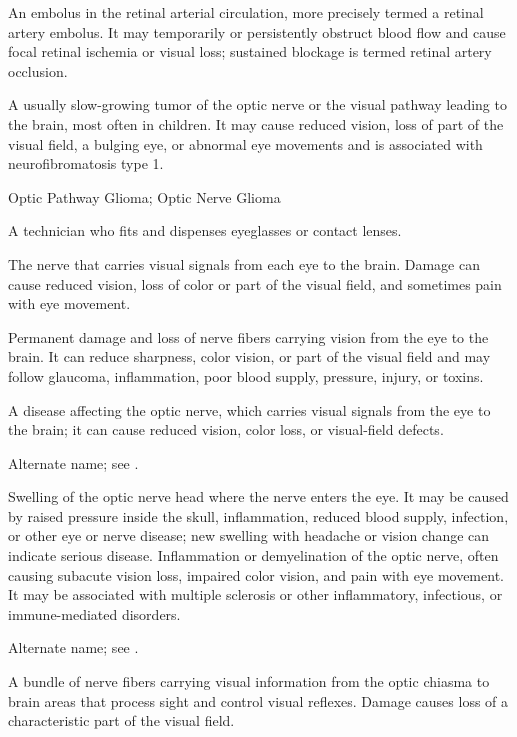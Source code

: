  An embolus in the retinal arterial circulation, more precisely termed a retinal artery embolus. It may temporarily or persistently obstruct blood flow and cause focal retinal ischemia or visual loss; sustained blockage is termed retinal artery occlusion.

 A usually slow-growing tumor of the optic nerve or the visual pathway leading to the brain, most often in children. It may cause reduced vision, loss of part of the visual field, a bulging eye, or abnormal eye movements and is associated with neurofibromatosis type 1.

\synonyms
Optic Pathway Glioma; Optic Nerve Glioma

 A technician who fits and dispenses eyeglasses or contact lenses.

 The nerve that carries visual signals from each eye to the brain. Damage can cause reduced vision, loss of color or part of the visual field, and sometimes pain with eye movement.

 Permanent damage and loss of nerve fibers carrying vision from the eye to the brain. It can reduce sharpness, color vision, or part of the visual field and may follow glaucoma, inflammation, poor blood supply, pressure, injury, or toxins.

 A disease affecting the optic nerve, which carries visual signals from the eye to the brain; it can cause reduced vision, color loss, or visual-field defects.

 Alternate name; see .

 Swelling of the optic nerve head where the nerve enters the eye. It may be caused by raised pressure inside the skull, inflammation, reduced blood supply, infection, or other eye or nerve disease; new swelling with headache or vision change can indicate serious disease.
 Inflammation or demyelination of the optic nerve, often causing subacute vision loss, impaired color vision, and pain with
eye movement. It may be associated with multiple sclerosis or other inflammatory,
infectious, or immune-mediated disorders.

 Alternate name; see .

 A bundle of nerve fibers carrying visual information from the optic chiasma to brain areas that process sight and control visual reflexes. Damage causes loss of a characteristic part of the visual field.

